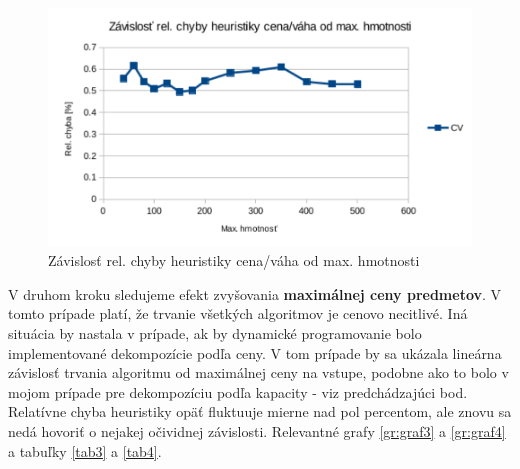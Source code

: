 \documentclass[slovak]{article}
\begin{document}
\begin{figure}[htb!]\centering
	\includegraphics[scale=0.8]{./3_2.pdf}
	\caption{Závislosť rel. chyby heuristiky cena/váha od max. hmotnosti}
	\label{gr:graf2}
\end{figure}

V druhom kroku sledujeme efekt zvyšovania \textbf{maximálnej ceny predmetov}. V tomto prípade platí, že trvanie všetkých algoritmov je cenovo necitlivé. Iná situácia by nastala v prípade, ak by dynamické programovanie bolo implementované dekompozície podľa ceny. V tom prípade by sa ukázala lineárna závislosť trvania algoritmu od maximálnej ceny na vstupe, podobne ako to bolo v mojom prípade pre dekompozíciu podľa kapacity - viz predchádzajúci bod. Relatívne chyba heuristiky opäť fluktuuje mierne nad pol percentom, ale znovu sa nedá hovoriť o nejakej očividnej závislosti. Relevantné grafy \ref{gr:graf3} a \ref{gr:graf4} a tabuľky \ref{tab3} a \ref{tab4}.
\end{document}
